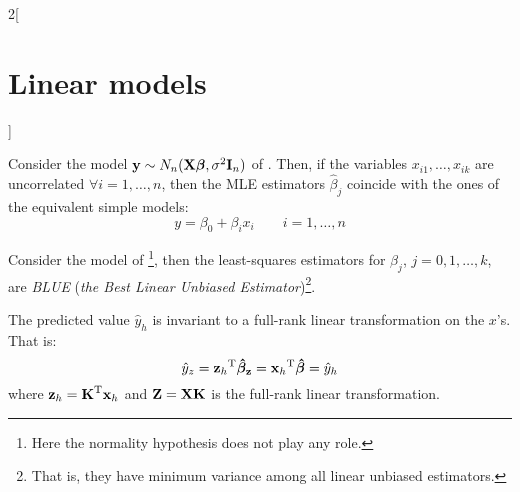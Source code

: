 \documentclass[../../../main_math.tex]{subfiles}
\begin{document}
\begin{multicols}{2}[\section{Linear models}]
\begin{proposition}
  \end{proposition}
  \begin{proposition}
    Consider the model $\boldsymbol{\mathrm{y}}\sim N_n(\boldsymbol{\mathrm{X\beta}},\sigma^2\boldsymbol{\mathrm{I}}_n)$ of . Then, if the variables $x_{i1},\ldots,x_{ik}$ are uncorrelated $\forall i=1,\ldots,n$, then the MLE estimators $\hat\beta_j$ coincide with the ones of the equivalent simple models: $$y=\beta_0+\beta_i x_i\qquad i=1,\ldots,n$$
  \end{proposition}
  \begin{theorem}
    Consider the model of \footnote{Here the normality hypothesis does not play any role.}, then the least-squares estimators for $\beta_j$, $j=0,1,\ldots,k$, are \emph{BLUE} (\emph{the Best Linear Unbiased Estimator})\footnote{That is, they have minimum variance among all linear unbiased estimators.}.
  \end{theorem}
  \begin{corollary}
    The predicted value $\hat{y}_h$ is invariant to a full-rank linear transformation on the $x$'s. That is: $$\hat{y}_z={\boldsymbol{\mathrm{z}}_h}^{\mathrm{T}}\boldsymbol{\mathrm{\hat{\beta}_z}}={\boldsymbol{\mathrm{x}}_h}^{\mathrm{T}}\boldsymbol{\mathrm{\hat{\beta}}}=\hat{y}_h$$ where $\boldsymbol{\mathrm{z}}_h={\boldsymbol{\mathrm{K}}}^{\mathrm{T}}\boldsymbol{\mathrm{x}}_h$ and $\boldsymbol{\mathrm{Z}}=\boldsymbol{\mathrm{XK}}$ is the full-rank linear transformation.
  \end{corollary}

\end{multicols}
\end{document}

